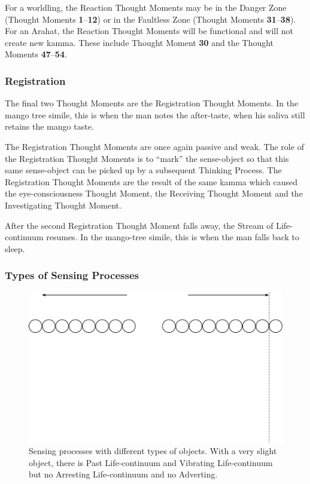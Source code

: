 For a worldling, the Reaction Thought Moments may be in the Danger Zone (Thought Moments \textbf{1}--\textbf{12}) or in the Faultless Zone (Thought Moments \textbf{31}--\textbf{38}). For an Arahat, the Reaction Thought Moments will be functional and will not create new kamma. These include Thought Moment \textbf{30} and the Thought Moments \textbf{47}--\textbf{54}.

\subsubsection*{Registration}

The final two Thought Moments are the Registration Thought Moments. In the mango tree simile, this is when the man notes the after-taste, when his saliva still retains the mango taste.

The Registration Thought Moments are once again passive and weak. The role of the Registration Thought Moments is to “mark” the sense-object so that this same sense-object can be picked up by a subsequent Thinking Process. The Registration Thought Moments are the result of the same kamma which caused the eye-consciousness Thought Moment, the Receiving Thought Moment and the Investigating Thought Moment.

After the second Registration Thought Moment falls away, the Stream of Life-continuum resumes. In the mango-tree simile, this is when the man falls back to sleep.

\subsubsection*{Types of Sensing Processes}

\begin{figure}[h]
\centering
\includegraphics[width=1\linewidth]{./Diagrams/Process1}
\caption{Sensing processes with different types of objects. With a very slight object, there is Past Life-continuum and Vibrating Life-continuum but no Arresting Life-continuum and no Adverting.}
\label{fig:Process1}
\end{figure}

